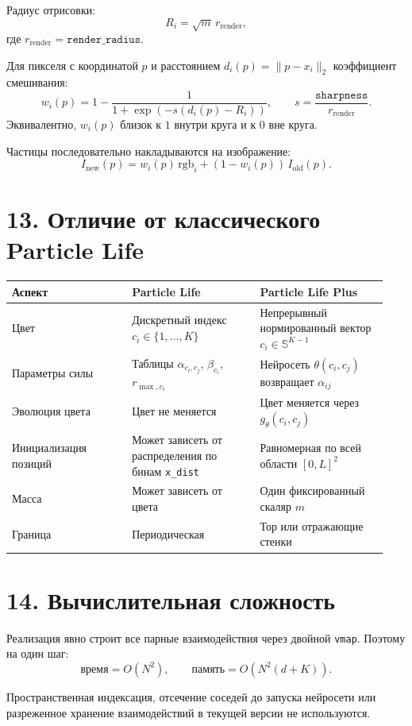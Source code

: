 \documentclass[11pt,a4paper]{article}
\begin{document}
Радиус отрисовки:
\[
R_i=\sqrt{m}\,r_{\mathrm{render}},
\]
где $r_{\mathrm{render}}=\texttt{render\_radius}$.

Для пикселя с координатой $p$ и расстоянием $d_i(p)=\|p-x_i\|_2$ коэффициент
смешивания:
\[
w_i(p)=1-\frac{1}{1+\exp(-s(d_i(p)-R_i))},
\qquad
s=\frac{\texttt{sharpness}}{r_{\mathrm{render}}}.
\]
Эквивалентно, $w_i(p)$ близок к $1$ внутри круга и к $0$ вне круга.

Частицы последовательно накладываются на изображение:
\[
I_{\mathrm{new}}(p)=w_i(p)\,\mathrm{rgb}_i+
(1-w_i(p))\,I_{\mathrm{old}}(p).
\]

\section*{13. Отличие от классического Particle Life}

\begin{longtable}{@{}p{0.30\linewidth}p{0.32\linewidth}p{0.32\linewidth}@{}}
\toprule
Аспект & Particle Life & Particle Life Plus \\
\midrule
\endhead
Цвет & Дискретный индекс $c_i\in\{1,\ldots,K\}$ & Непрерывный нормированный вектор $c_i\in\mathbb{S}^{K-1}$ \\
Параметры силы & Таблицы $\alpha_{c_i,c_j}$, $\beta_{c_i}$, $r_{\max,c_i}$ & Нейросеть $\theta(c_i,c_j)$ возвращает $\alpha_{ij}$ \\
Эволюция цвета & Цвет не меняется & Цвет меняется через $g_\theta(c_i,c_j)$ \\
Инициализация позиций & Может зависеть от распределения по бинам \texttt{x\_dist} & Равномерная по всей области $[0,L]^2$ \\
Масса & Может зависеть от цвета & Один фиксированный скаляр $m$ \\
Граница & Периодическая & Тор или отражающие стенки \\
\bottomrule
\end{longtable}

\section*{14. Вычислительная сложность}

Реализация явно строит все парные взаимодействия через двойной \texttt{vmap}.
Поэтому на один шаг:
\[
\text{время}=O(N^2),\qquad
\text{память}=O(N^2(d+K)).
\]

Пространственная индексация, отсечение соседей до запуска нейросети или
разреженное хранение взаимодействий в текущей версии не используются.
\end{document}
